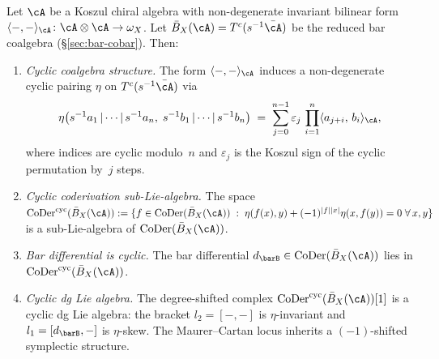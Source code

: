 \begin{proposition}\label{prop:genus0-cyclic-coderivation}
Let $\cA$ be a Koszul chiral algebra with non-degenerate
invariant bilinear form
$\langle{-},{-}\rangle_{\cA}\colon \cA\otimes\cA\to\omega_X$.
Let $\bar{B}_X(\cA) = T^c(s^{-1}\bar{\cA})$ be the reduced bar
coalgebra
\textup{(}\S\textup{\ref{sec:bar-cobar}}\textup{)}.
Then:
\begin{enumerate}[label=\textup{(\roman*)}]
\item \emph{Cyclic coalgebra structure.}
  The form $\langle{-},{-}\rangle_{\cA}$ induces a non-degenerate
  cyclic pairing $\eta$ on $T^c(s^{-1}\bar{\cA})$ via
  \begin{equation}\label{eq:cyclic-coalgebra-pairing}
  \eta\bigl(s^{-1}a_1\,|\cdots|\,s^{-1}a_n,\;
  s^{-1}b_1\,|\cdots|\,s^{-1}b_n\bigr)
  \;=\;
  \sum_{j=0}^{n-1}\varepsilon_j\,
  \prod_{i=1}^{n}
  \langle a_{j+i},\,b_i\rangle_{\cA},
  \end{equation}
  where indices are cyclic modulo~$n$ and $\varepsilon_j$ is
  the Koszul sign of the cyclic permutation by~$j$ steps.

\item \emph{Cyclic coderivation sub-Lie-algebra.}
  The space
  $\operatorname{CoDer}^{\mathrm{cyc}}(\bar{B}_X(\cA))
  := \{f\in\operatorname{CoDer}(\bar{B}_X(\cA))\;:\;
  \eta(f(x),y)+(-1)^{|f||x|}\eta(x,f(y))=0\;\forall\,x,y\}$
  is a sub-Lie-algebra of
  $\operatorname{CoDer}(\bar{B}_X(\cA))$.

\item \emph{Bar differential is cyclic.}
  The bar differential $d_{\barB}\in
  \operatorname{CoDer}(\bar{B}_X(\cA))$ lies in
  $\operatorname{CoDer}^{\mathrm{cyc}}(\bar{B}_X(\cA))$.

\item \emph{Cyclic dg Lie algebra.}
  The degree-shifted complex
  $\operatorname{CoDer}^{\mathrm{cyc}}(\bar{B}_X(\cA))[1]$
  is a cyclic dg Lie algebra: the bracket $l_2 = [-,-]$
  is $\eta$-invariant and $l_1 = [d_{\barB},-]$ is
  $\eta$-skew.  The Maurer--Cartan locus inherits a
  $(-1)$-shifted symplectic structure.
\end{enumerate}
\end{proposition}

